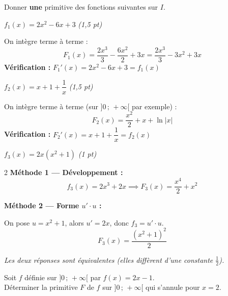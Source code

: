 \documentclass[a4paper,11pt]{article}
\begin{document}
\vspace{0.5cm}

\begin{tcolorbox}[exobox={Exercice 2 \quad Calcul de primitives \hfill \normalfont\textit{(4 points)}}]
  Donner \textbf{une} primitive des fonctions suivantes sur $I$.
\end{tcolorbox}

\medskip
\textbf{$f_1(x) = 2x^2 - 6x + 3$} \hfill \textit{(1,5 pt)}

\begin{tcolorbox}[corrigebox]
  On intègre terme à terme :
  \[
    F_1(x) = \frac{2x^3}{3} - \frac{6x^2}{2} + 3x = \frac{2x^3}{3} - 3x^2 + 3x
  \]
  \textbf{Vérification :} $F_1'(x) = 2x^2 - 6x + 3 = f_1(x)$ \checkmark
\end{tcolorbox}

\medskip
\textbf{$f_2(x) = x + 1 + \dfrac{1}{x}$} \hfill \textit{(1,5 pt)}

\begin{tcolorbox}[corrigebox]
  On intègre terme à terme (sur $]0\,;\,+\infty[$ par exemple) :
  \[
    F_2(x) = \frac{x^2}{2} + x + \ln|x|
  \]
  \textbf{Vérification :} $F_2'(x) = x + 1 + \dfrac{1}{x} = f_2(x)$ \checkmark
\end{tcolorbox}

\medskip
\textbf{$f_3(x) = 2x(x^2 + 1)$} \hfill \textit{(1 pt)}

\begin{tcolorbox}[corrigebox]
  \begin{multicols}{2}
  \textbf{Méthode 1 — Développement :}
  \[
    f_3(x) = 2x^3 + 2x \implies F_3(x) = \frac{x^4}{2} + x^2
  \]

  \columnbreak

  \textbf{Méthode 2 — Forme $u'\cdot u$ :}

  On pose $u = x^2 + 1$, alors $u' = 2x$, donc $f_3 = u' \cdot u$.
  \[
    F_3(x) = \frac{(x^2+1)^2}{2}
  \]
  \end{multicols}
  \textit{Les deux réponses sont équivalentes (elles diffèrent d'une constante $\frac{1}{2}$).}
\end{tcolorbox}

\vspace{0.5cm}

\begin{tcolorbox}[exobox={Exercice 3 \quad Calcul d'une primitive particulière \hfill \normalfont\textit{(2 points)}}]
  Soit $f$ définie sur $]0\,;\,+\infty[$ par $f(x) = 2x - 1$.\\
  Déterminer la primitive $F$ de $f$ sur $]0\,;\,+\infty[$ qui s'annule pour $x = 2$.
\end{tcolorbox}
\end{document}
